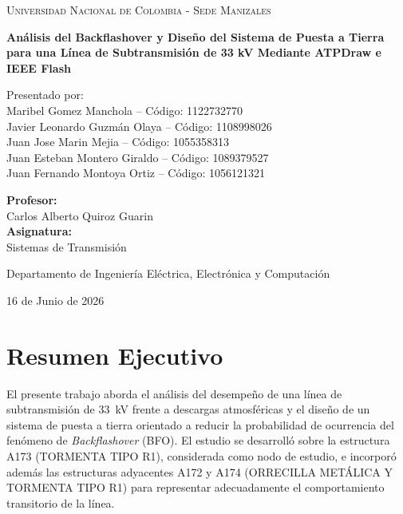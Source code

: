 \documentclass[12pt,letterpaper]{article}
\begin{document}
\begin{titlepage}
    \centering
    {\scshape\LARGE Universidad Nacional de Colombia - Sede Manizales \par}
    \vspace{0.5cm}
    {\huge\bfseries Análisis del Backflashover y Diseño del Sistema de Puesta a Tierra para una Línea de Subtransmisión de 33 kV Mediante ATPDraw e IEEE Flash\par}
    \vspace{0.5cm}
    {\Large Presentado por: \\
    Maribel Gomez Manchola – Código: 1122732770 \\
    Javier Leonardo Guzmán Olaya – Código: 1108998026 \\
    Juan Jose Marin Mejia – Código: 1055358313 \\
    Juan Esteban Montero Giraldo – Código: 1089379527 \\
    Juan Fernando Montoya Ortiz – Código: 1056121321
   \par}
    \vspace{1cm}
    {\Large \textbf{Profesor:}}\\
    {\Large  Carlos Alberto Quiroz Guarin}\\[2cm]
	{\Large \textbf{Asignatura:}}\\
	{\Large Sistemas de Transmisión}\\[0.5cm]
    \vspace{1cm}
    {\Large Departamento de Ingeniería Eléctrica, Electrónica y Computación\par}
    \vspace{1cm}
    {\Large 16 de Junio de 2026 \par}
\end{titlepage}

\renewcommand{\abstractname}{Resumen} %



\tableofcontents

\newpage

\section{Resumen Ejecutivo}

El presente trabajo aborda el análisis del desempeño de una línea de subtransmisión de \SI{33}{\kilo\volt} frente a descargas atmosféricas y el diseño de un sistema de puesta a tierra orientado a reducir la probabilidad de ocurrencia del fenómeno de \textit{Backflashover} (BFO). El estudio se desarrolló sobre la estructura A173 (TORMENTA TIPO R1), considerada como nodo de estudio, e incorporó además las estructuras adyacentes A172 y A174 (ORRECILLA METÁLICA Y TORMENTA TIPO R1) para representar adecuadamente el comportamiento transitorio de la línea.
\end{document}
